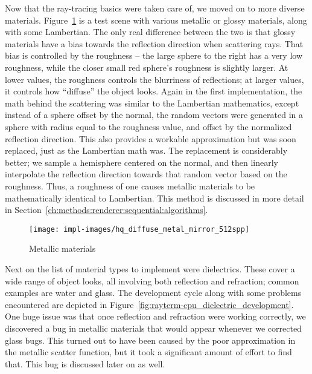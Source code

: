 Now that the ray-tracing basics were taken care of, we moved on to more diverse materials.
Figure~\ref{fig:rayterm-cpu_metallic} is a test scene with various metallic or glossy materials, along with some Lambertian.
The only real difference between the two is that glossy materials have a bias towards the reflection direction when scattering rays.
That bias is controlled by the roughness -- the large sphere to the right has a very low roughness, while the closer small red sphere's roughness is slightly larger.
At lower values, the roughness controls the blurriness of reflections; at larger values, it controls how ``diffuse'' the object looks.
Again in the first implementation, the math behind the scattering was similar to the Lambertian mathematics, except instead of a sphere offset by the normal, the random vectors were generated in a sphere with radius equal to the roughness value, and offset by the normalized reflection direction.
This also provides a workable approximation but was soon replaced, just as the Lambertian math was.
The replacement is considerably better; we sample a hemisphere centered on the normal, and then linearly interpolate the reflection direction towards that random vector based on the roughness.
Thus, a roughness of one causes metallic materials to be mathematically identical to Lambertian.
This method is discussed in more detail in Section~\ref{ch:methods:renderer:sequential:algorithms}.

\vspace{0.3em}
\begin{figure}[htb]
  \centering
  \texttt{[image: impl-images/hq\_diffuse\_metal\_mirror\_512spp]}
  \caption{Metallic materials}
  \label{fig:rayterm-cpu_metallic}
\end{figure}

Next on the list of material types to implement were dielectrics.
These cover a wide range of object looks, all involving both reflection and refraction; common examples are water and glass.
The development cycle along with some problems encountered are depicted in Figure~\ref{fig:rayterm-cpu_dielectric_development}.
One huge issue was that once reflection and refraction were working correctly, we discovered a bug in metallic materials that would appear whenever we corrected glass bugs.
This turned out to have been caused by the poor approximation in the metallic scatter function, but it took a significant amount of effort to find that.
This bug is discussed later on as well.

